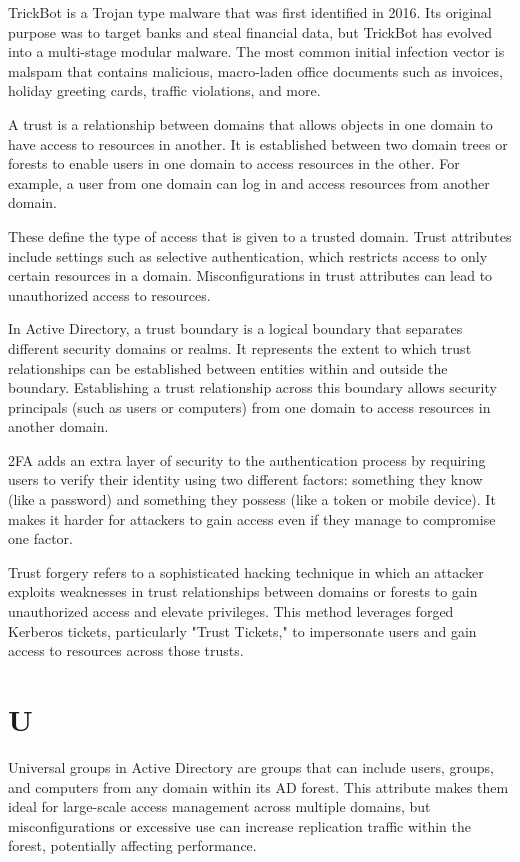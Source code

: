  TrickBot is a Trojan type malware that was first identified in 2016. Its original purpose was to target banks and steal financial data, but TrickBot has evolved into a multi-stage modular malware. The most common initial infection vector is malspam that contains malicious, macro-laden office documents such as invoices, holiday greeting cards, traffic violations, and more.

 A trust is a relationship between domains that allows objects in one domain to have access to resources in another. It is established between two domain trees or forests to enable users in one domain to access resources in the other. For example, a user from one domain can log in and access resources from another domain.

 These define the type of access that is given to a trusted domain. Trust attributes include settings such as selective authentication, which restricts access to only certain resources in a domain. Misconfigurations in trust attributes can lead to unauthorized access to resources.

 In Active Directory, a trust boundary is a logical boundary that separates different security domains or realms. It represents the extent to which trust relationships can be established between entities within and outside the boundary. Establishing a trust relationship across this boundary allows security principals (such as users or computers) from one domain to access resources in another domain.

 2FA adds an extra layer of security to the authentication process by requiring users to verify their identity using two different factors: something they know (like a password) and something they possess (like a token or mobile device). It makes it harder for attackers to gain access even if they manage to compromise one factor.


 Trust forgery refers to a sophisticated hacking technique in which an attacker exploits weaknesses in trust relationships between domains or forests to gain unauthorized access and elevate privileges. This method leverages forged Kerberos tickets, particularly "Trust Tickets," to impersonate users and gain access to resources across those trusts.

\section*{U}
 Universal groups in Active Directory are groups that can include users, groups, and computers from any domain within its AD forest. This attribute makes them ideal for large-scale access management across multiple domains, but misconfigurations or excessive use can increase replication traffic within the forest, potentially affecting performance.

